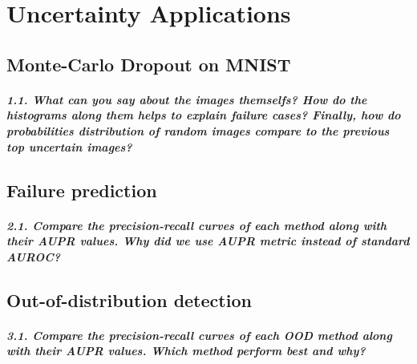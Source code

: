 \graphicspath{{figs/3c}}

\chapter{Uncertainty Applications}
\section{Monte-Carlo Dropout on MNIST}

\paragraph*{1.1. What can you say about the images themselfs? How do the histograms along them helps to explain failure cases? Finally, how do probabilities distribution of random images compare to the previous top uncertain images?}

\section{Failure prediction}

\paragraph*{2.1. Compare the precision-recall curves of each method along with their AUPR values. Why did we use AUPR metric instead of standard AUROC?}


\section{Out-of-distribution detection}

\paragraph*{3.1. Compare the precision-recall curves of each OOD method along with their AUPR values. Which method perform best and why?}